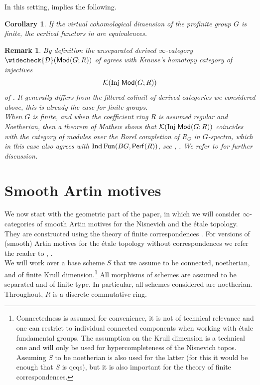\documentclass[reqno]{amsart}
\numberwithin{equation}{section}\theoremstyle{thms}
\newtheorem{cor}[equation]{Corollary}
\theoremstyle{defn}
\newtheorem{rem}[equation]{Remark}
\newcommand{\cD}{\mathcal{D}}
\newcommand{\cK}{\mathcal{K}}
\newcommand{\tn}[1]{\textnormal{#1}}
\newcommand{\tsf}[1]{\textsf{\textup{#1}}}
\newcommand{\fun}{\tn{Fun}}
\newcommand{\modgr}{\tsf{Mod}(G;R)}
\newcommand{\ind}{\tn{Ind}}
\begin{document}
In this setting,  implies the following.

\begin{cor}\label{cor:smashinghypercompletionreps}
If the virtual cohomological dimension of the profinite group $G$ is finite, the vertical functors in  are equivalences.
\end{cor}

\begin{rem}
By definition the unseparated derived $\infty$-category $\widecheck{\cD}(\modgr)$ of \cite[Corollary C.5.8.9]{lur18} agrees with Krause's homotopy category of injectives 
$$\cK(\tn{Inj} \; \modgr)$$ 
of \cite{kra05,kra15}. It generally differs from the filtered colimit of derived categories we considered above, this is already the case for finite groups. \\
When $G$ is finite, and when the coefficient ring $R$ is assumed regular and Noetherian, then a theorem of Mathew shows that $\cK(\tn{Inj} \; \modgr)$ coincides with the category of modules over the Borel completion of $R_G$ in $G$-spectra, which in this case also agrees with $\ind\,\fun(BG,\tsf{Perf}(R))$, see \cite[Theorem 3.7]{bar21}, \cite[Theorem A.4]{tre15}. We refer to \cite[Remark 3.35]{bchnl25} for further discussion.
\end{rem}

\section{Smooth Artin motives}\label{sec:motives}

We now start with the geometric part of the paper, in which we will consider $\infty$-categories of smooth Artin motives for the Nisnevich and the étale topology. They are constructed using the theory of finite correspondences \cite[§9]{cd19}. For versions of (smooth) Artin motives for the étale topology without correspondences we refer the reader to \cite{az12}, \cite{rui25a,rui25b}. \\ 
We will work over a base scheme $S$ that we assume to be connected, noetherian, and of finite Krull dimension.\footnote{Connectedness is assumed for convenience, it is not of technical relevance and one can restrict to individual connected components when working with étale fundamental groups. The assumption on the Krull dimension is a technical one and will only be used for hypercompleteness of the Nisnevich topos. Assuming $S$ to be noetherian is also used for the latter (for this it would be enough that $S$ is qcqs), but it is also important for the theory of finite correspondences.} All morphisms of schemes are assumed to be separated and of finite type. In particular, all schemes considered are noetherian. Throughout, $R$ is a discrete commutative ring.
\end{document}
